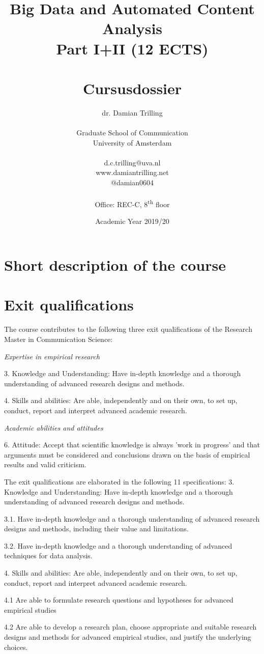 \documentclass[a4paper,12pt]{report}
\title{Big Data and Automated Content Analysis\\ Part I+II (12 ECTS)\\~\\Cursusdossier}
\author{dr. Damian Trilling\\~\\Graduate School of Communication\\University of Amsterdam\\~\\d.c.trilling@uva.nl\\www.damiantrilling.net\\@damian0604\\~\\Office: REC-C, 8\textsuperscript{th} floor}
\date{Academic Year 2019/20}
\begin{document}
\maketitle

\tableofcontents


\chapter{Short description of the course}



\chapter{Exit qualifications}

The course contributes to the following three exit qualifications of the Research Master in Communication Science: 


\textit{Expertise in empirical research}


	3.	Knowledge and Understanding: Have in-depth knowledge and a thorough understanding of advanced research designs and methods.


	4.	Skills and abilities: Are able, independently and on their own, to set up, conduct, report and interpret advanced academic research.


\textit{Academic abilities and attitudes}


	6.	Attitude: Accept that scientific knowledge is always 'work in progress' and that arguments must be considered and conclusions drawn on the basis of empirical results and valid criticism.


The exit qualifications are elaborated in the following 11 specifications:
3. Knowledge and Understanding: Have in-depth knowledge and a thorough understanding of advanced research designs and methods. 


3.1. Have in-depth knowledge and a thorough understanding of advanced research designs and methods, including their value and limitations.


3.2.	Have in-depth knowledge and a thorough understanding of advanced techniques for data analysis.


4. Skills and abilities: Are able, independently and on their own, to set up, conduct, report and interpret advanced academic research.


4.1	Are able to formulate research questions and hypotheses for advanced empirical studies


4.2	Are able to develop a research plan, choose appropriate and suitable research designs and methods for advanced empirical studies, and justify the underlying choices. 
\end{document}
